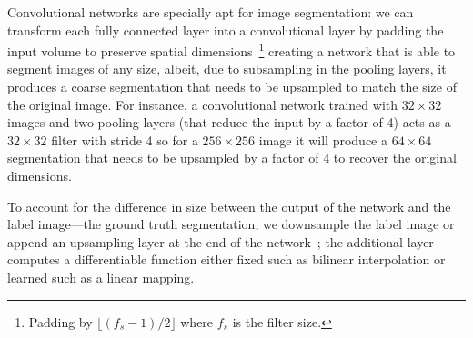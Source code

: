 Convolutional networks are specially apt for image segmentation: we can transform each fully connected layer into a convolutional layer by padding the input volume to preserve spatial dimensions~\footnote{Padding by $\lfloor (f_s-1)/2\rfloor$ where $f_s$ is the filter size.} creating a network that is able to segment images of any size, albeit, due to subsampling in the pooling layers, it produces a coarse segmentation that needs to be upsampled to match the size of the original image.
For instance, a convolutional network trained with $32\times 32$ images and two pooling layers (that reduce the input by a factor of 4) acts as a $32 \times 32$ filter with stride 4 so for a $256 \times 256$ image it will produce a $64 \times 64$ segmentation that needs to be upsampled by a factor of 4 to recover the original dimensions.

To account for the difference in size between the output of the network and the label image---the ground truth segmentation\textemdash, we downsample the label image or append an upsampling layer at the end of the network~\cite{Long2015}; the additional layer computes a differentiable function either fixed such as bilinear interpolation or learned such as a linear mapping.
